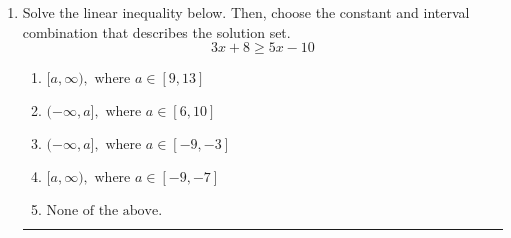 \documentclass[14pt]{extbook}
\newcommand{\litem}[1]{\item#1\hspace*{-1cm}\rule{\textwidth}{0.4pt}}
\begin{document}
\begin{enumerate}
{\begin{enumerate}[label=\Alph*.]
\end{enumerate} }
\litem{
Solve the linear inequality below. Then, choose the constant and interval combination that describes the solution set.\[ 3x + 8 \geq 5x -10 \]\begin{enumerate}[label=\Alph*.]
\item \( [a, \infty), \text{ where } a \in [9, 13] \)
\item \( (-\infty, a], \text{ where } a \in [6, 10] \)
\item \( (-\infty, a], \text{ where } a \in [-9, -3] \)
\item \( [a, \infty), \text{ where } a \in [-9, -7] \)
\item \( \text{None of the above}. \)

\end{enumerate} }
\end{enumerate}
\end{document}
